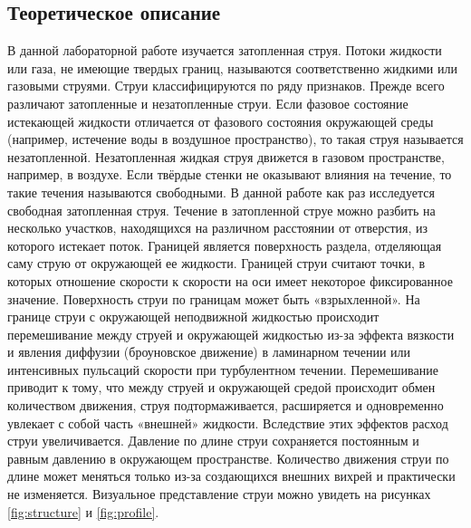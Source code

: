         \subsection*{Теоретическое описание}
            В данной лабораторной работе изучается затопленная струя. Потоки жидкости или газа, не имеющие твердых границ, называются соответственно жидкими или газовыми струями. Струи классифицируются по ряду признаков. Прежде всего различают затопленные и незатопленные струи. Если фазовое состояние истекающей жидкости отличается от фазового состояния окружающей среды (например, истечение воды в воздушное пространство), то такая струя называется незатопленной. Незатопленная жидкая струя движется в газовом пространстве, например, в воздухе. Если твёрдые стенки не оказывают влияния на течение, то такие течения называются свободными. В данной работе как раз исследуется свободная затопленная струя. Течение в затопленной струе можно разбить на несколько участков, находящихся на различном расстоянии от отверстия, из которого истекает поток. Границей является поверхность раздела, отделяющая саму струю от окружающей ее жидкости. Границей струи считают точки, в которых отношение скорости к скорости на оси имеет некоторое фиксированное значение. Поверхность струи по границам может быть «взрыхленной». На границе струи с окружающей неподвижной жидкостью происходит перемешивание между струей и окружающей жидкостью из-за эффекта вязкости и явления диффузии (броуновское движение) в ламинарном течении или интенсивных пульсаций скорости при турбулентном течении. Перемешивание приводит к тому, что между струей и окружающей средой происходит обмен количеством движения, струя подтормаживается, расширяется и одновременно увлекает с собой часть «внешней» жидкости. Вследствие этих эффектов расход струи увеличивается. Давление по длине струи сохраняется постоянным и равным давлению в окружающем пространстве. Количество движения струи по длине может меняться только из-за создающихся внешних вихрей и практически не изменяется. Визуальное представление струи можно увидеть на рисунках \ref{fig:structure} и \ref{fig:profile}.

